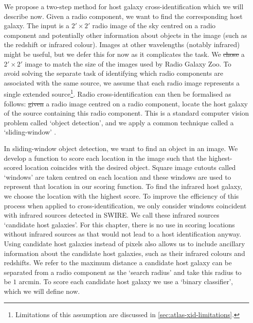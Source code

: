 \documentclass[11pt, a4paper]{book}
\providecommand{\DIFaddtex}[1]{{\protect\color{blue}\uwave{#1}}} %
\providecommand{\DIFdeltex}[1]{{\protect\color{red}\sout{#1}}}                      %
\providecommand{\DIFaddbegin}{} %
\providecommand{\DIFaddend}{} %
\providecommand{\DIFdelbegin}{} %
\providecommand{\DIFdelend}{} %
\providecommand{\DIFadd}[1]{\texorpdfstring{\DIFaddtex{#1}}{#1}} %
\providecommand{\DIFdel}[1]{\texorpdfstring{\DIFdeltex{#1}}{}} %
\newcommand{\DIFscaledelfig}{0.5}
\newlength{\DIFdelgraphicswidth} %
\newlength{\DIFdelgraphicsheight} %
\newcommand{\DIFaddincludegraphics}[2][]{{\color{blue}\fbox{\DIFOincludegraphics[#1]{#2}}}} %
\newcommand{\DIFdelincludegraphics}[2][]{%
\sbox{\DIFdelgraphicsbox}{\DIFOincludegraphics[#1]{#2}}%
\settoboxwidth{\DIFdelgraphicswidth}{\DIFdelgraphicsbox} %
\settoboxtotalheight{\DIFdelgraphicsheight}{\DIFdelgraphicsbox} %
\scalebox{\DIFscaledelfig}{%
\parbox[b]{\DIFdelgraphicswidth}{\usebox{\DIFdelgraphicsbox}\\[-\baselineskip] \rule{\DIFdelgraphicswidth}{0em}}\llap{\resizebox{\DIFdelgraphicswidth}{\DIFdelgraphicsheight}{%
\setlength{\unitlength}{\DIFdelgraphicswidth}%
\begin{picture}(1,1)%
\thicklines\linethickness{2pt} %
{\color[rgb]{1,0,0}\put(0,0){\framebox(1,1){}}}%
{\color[rgb]{1,0,0}\put(0,0){\line( 1,1){1}}}%
{\color[rgb]{1,0,0}\put(0,1){\line(1,-1){1}}}%
\end{picture}%
}\hspace*{3pt}}} %
} %
\DeclareRobustCommand{\DIFaddbegin}{\DIFOaddbegin \let\includegraphics\DIFaddincludegraphics} %
\DeclareRobustCommand{\DIFaddend}{\DIFOaddend \let\includegraphics\DIFOincludegraphics} %
\DeclareRobustCommand{\DIFdelbegin}{\DIFOdelbegin \let\includegraphics\DIFdelincludegraphics} %
\DeclareRobustCommand{\DIFdelend}{\DIFOaddend \let\includegraphics\DIFOincludegraphics} %
\begin{document}
    We propose a two-step method for host galaxy cross-identification
    {which we will describe now}. Given a radio component, we want to find
    the corresponding host galaxy. The input is a $2' \times
    2'$ radio image of
    the sky centred on a radio component {and potentially other information about
    objects in the image (such as the redshift or infrared colour)}. {Images at other wavelengths (notably infrared) might be
    useful, but we defer this for now as it complicates the task.
    {We \DIFdelbegin \DIFdel{chose }\DIFdelend \DIFaddbegin \DIFadd{choose }\DIFaddend a $2' \times 2'$ image to match} the size of the images used
    by Radio Galaxy Zoo. To avoid solving the separate task of identifying
    which radio components are associated with the same source, we assume
    that each radio image represents a single extended
    source\footnote{Limitations of this assumption are discussed in
    \autoref{sec:atlas-xid-limitations}.}. Radio cross-identification can then
    be formalised as follows: \DIFdelbegin \DIFdel{given }\DIFdelend \DIFaddbegin \DIFadd{Given }\DIFaddend a radio image centred on a radio
    component, locate the host galaxy of the source containing this radio
    component. This is a standard computer vision problem called `object
    detection', and we apply a common technique called a `sliding-window'
    \citep{rowley1996facedetection}}.

    {In sliding-window object detection, we want to find an object in an image.
    We develop a function to score each location in the image such that the
    highest-scored location coincides with the desired object. Square image
    cutouts called `windows' are taken centred on each location and these
    windows are used to represent that location in our scoring function. To
    find the infrared host galaxy, we choose the location with the highest
    score. To improve the efficiency of this process when applied to
    cross-identification, we only consider windows coincident with infrared
    sources detected in SWIRE. We call these infrared sources `candidate
    host galaxies'. For this chapter, there is no use in scoring
    locations without infrared sources as that would not lead to a host identification
    anyway. Using candidate host galaxies instead of pixels also
    allows us to include ancillary information about the candidate host
    galaxies, such as their infrared colours and redshifts. We refer to the
    maximum distance a candidate host galaxy can be separated from a radio component as
    the `search radius' and take this radius to be $1$ arcmin. To score each
    candidate host galaxy we use a `binary classifier', which we will define
    now.}
\end{document}
